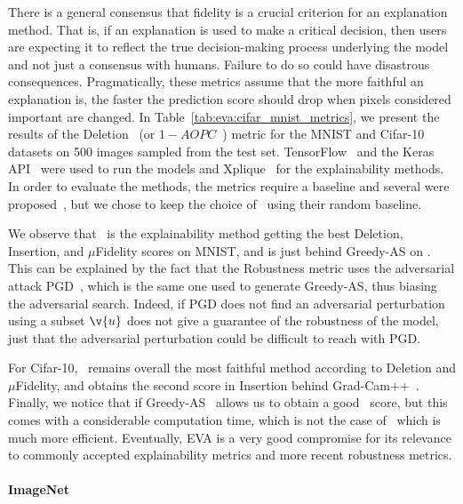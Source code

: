 There is a general consensus that fidelity is a crucial criterion for an explanation method. That is, if an explanation is used to make a critical decision, then users are expecting it to reflect the true decision-making process underlying the model and not just a consensus with humans. Failure to do so could have disastrous consequences. Pragmatically, these metrics assume that the more faithful an explanation is, the faster the prediction score should drop when pixels considered important are changed.
In Table~\ref{tab:eva:cifar_mnist_metrics}, we present the results of the Deletion~\cite{petsiuk2018rise} (or $1 - AOPC$~\cite{samek2016evaluating}) metric for the MNIST and Cifar-10 datasets on 500 images sampled from the test set. TensorFlow~\cite{tensorflow2015} and the Keras API~\cite{chollet2015keras} were used to run the models and Xplique~\cite{fel2022xplique} for the explainability methods.
In order to evaluate the methods, the metrics require a baseline and several were proposed~\cite{sturmfels2020visualizing, hsieh2020evaluations}, but we chose to keep the choice of~\cite{hsieh2020evaluations} using their random baseline.
 
We observe that \eva~is the explainability method getting the best Deletion, Insertion, and $\mu$Fidelity scores on MNIST, and is just behind Greedy-AS on \rsr. This can be explained by the fact that the Robustness metric uses the adversarial attack PGD~\cite{madry2017pgd}, which is the same one used to generate Greedy-AS, thus biasing the adversarial search. Indeed, if PGD does not find an adversarial perturbation using a subset $\v{u}$ does not give a guarantee of the robustness of the model, just that the adversarial perturbation could be difficult to reach with PGD.

For Cifar-10, \eva~remains overall the most faithful method according to Deletion and $\mu$Fidelity, and obtains the second score in Insertion behind Grad-Cam++~\cite{chattopadhay2018grad}. 
Finally, we notice that if Greedy-AS~\cite{hsieh2020evaluations} allows us to obtain a good \rsr~score, but this comes with a considerable computation time, which is not the case of \eva~which is much more efficient. Eventually, EVA is a very good compromise for its relevance to commonly accepted explainability metrics and more recent robustness metrics.

\paragraph{ImageNet}

